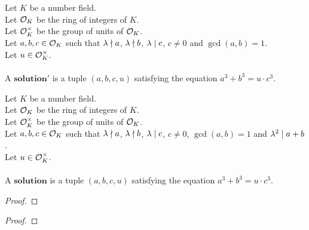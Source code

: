 \begin{definition}[Solution']
    \label{def:Solution1}
    \leanok
    Let $K$ be a number field. \\
    Let $\mathcal{O}_K$ be the ring of integers of $K$. \\
    Let $\mathcal{O}^\times_K$ be the group of units of $\mathcal{O}_K$. \\
    Let $a, b, c \in \mathcal{O}_K$ such that $\lambda \nmid a$,
    $\lambda \nmid b$, $\lambda \mid c$, $c \neq 0$ and $\gcd(a,b)=1$.\\
    Let $u \in \mathcal{O}^\times_K$. \\\\
    A $\boldsymbol{solution'}$ is a tuple $(a, b, c, u)$
    satisfying the equation $a^3 + b^3 = u \cdot c^3.$
\end{definition}

\begin{definition}[Solution]
    \label{def:Solution}
    \leanok
    Let $K$ be a number field. \\
    Let $\mathcal{O}_K$ be the ring of integers of $K$. \\
    Let $\mathcal{O}^\times_K$ be the group of units of $\mathcal{O}_K$. \\
    Let $a, b, c \in \mathcal{O}_K$ such that $\lambda \nmid a$,
    $\lambda \nmid b$, $\lambda \mid c$, $c \neq 0$, $\gcd(a,b)=1$
    and $\lambda^2 \mid a+b$. \\
    Let $u \in \mathcal{O}^\times_K$. \\\\
    A $\boldsymbol{solution}$ is a tuple $(a, b, c, u)$
    satisfying the equation $a^3 + b^3 = u \cdot c^3.$
\end{definition}

\begin{lemma}
    \label{lmm:Solution1.multiplicity_lambda_c_finite}
    \leanok
\end{lemma}
\begin{proof}
    \leanok
\end{proof}

\begin{lemma}
    \label{lmm:exists_minimal}
    \leanok
\end{lemma}
\begin{proof}
    \leanok
\end{proof}

